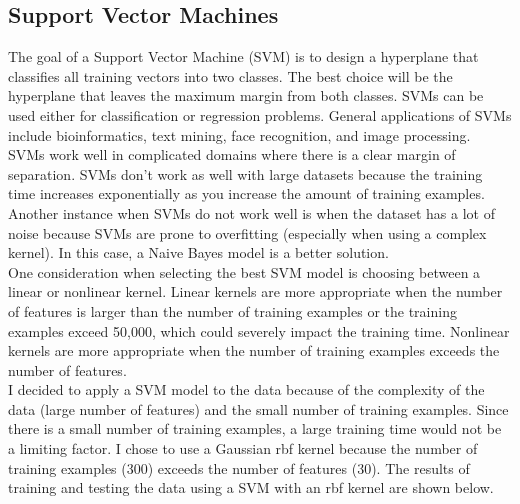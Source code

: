 \documentclass[11pt]{article}
\begin{document}
\subsection{Support Vector Machines}

The goal of a Support Vector Machine (SVM) is to design a hyperplane that classifies all training vectors into two classes. The best choice will be the hyperplane that leaves the maximum margin from both classes. SVMs can be used either for classification or regression problems. General applications of SVMs include bioinformatics, text mining, face recognition, and image processing.\\

SVMs work well in complicated domains where there is a clear margin of separation. SVMs don’t work as well with large datasets because the training time increases exponentially as you increase the amount of training examples. Another instance when SVMs do not work well is when the dataset has a lot of noise because SVMs are prone to overfitting (especially when using a complex kernel). In this case, a Naive Bayes model is a better solution.\\

One consideration when selecting the best SVM model is choosing between a linear or nonlinear kernel. Linear kernels are more appropriate when the number of features is larger than the number of training examples or the training examples exceed 50,000, which could severely impact the training time. Nonlinear kernels are more appropriate when the number of training examples exceeds the number of features.\\

I decided to apply a SVM model to the data because of the complexity of the data (large number of features) and the small number of training examples. Since there is a small number of training examples, a large training time would not be a limiting factor. I chose to use a Gaussian rbf kernel because the number of training examples (300) exceeds the number of features (30). The results of training and testing the data using a SVM with an rbf kernel are shown below.\\
\end{document}
